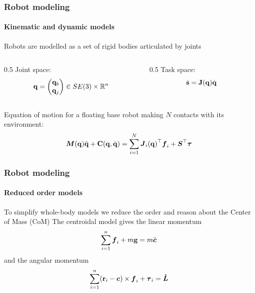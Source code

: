 \documentclass[10pt]{beamer}
\begin{document}
\begin{frame}
  \frametitle{Robot modeling}
  \framesubtitle{Kinematic and dynamic models}
  Robots are modelled as a set of rigid bodies articulated by joints
  \vfill
  \begin{columns}[T]
    \begin{column}{0.5\textwidth}
      Joint space:
      \begin{equation*}
        \mathbf{q} =
        \begin{pmatrix}
          \mathbf{q}_b \\
          \mathbf{q}_j
        \end{pmatrix}
        \in SE{(3)} \times \mathbb{R}^n
      \end{equation*}
    \end{column}
    \begin{column}{0.5\textwidth}
      Task space:
      \vfill
      \begin{equation*}
        \dot{{\bf s}} = \mathbf{J}(\mathbf{q})\dot{\mathbf{q}}
      \end{equation*}
    \end{column}
  \end{columns}
  \vfill
  Equation of motion for a floating base robot making $N$ contacts with its environment:
  \begin{equation*}
    \boldsymbol{M}(\mathbf{q})\ddot{\mathbf{q}} + \textbf{C}(\mathbf{q}, \dot{\mathbf{q}}) = \sum_{i =
    1}^{N}{\boldsymbol{J}_{i}(\mathbf{q})}^\top\boldsymbol{f}_i + {\boldsymbol{S}}^\top\boldsymbol{\tau}
  \end{equation*}
\end{frame}

\begin{frame}
  \frametitle{Robot modeling}
  \framesubtitle{Reduced order models}
  To simplify whole-body models we reduce the order and reason about the Center of Mass (CoM)
  \vfill
  The centroidal model gives the linear momentum
  \begin{equation}
    \label{Eq:NE_sum_forces}
    \sum_{i=1}^{n} \boldsymbol{f}_{i} + m\mathbf{g} = m\ddot{\boldsymbol{c}}
  \end{equation}
  and the angular momentum
  \begin{equation}
    \label{Eq:NE_sum_moments}
    \sum_{i=1}^{n} (\mathbf{r}_{i} - \boldsymbol{c}) \times \boldsymbol{f}_{i} + \boldsymbol{\tau}_{i} = \boldsymbol{\dot{L}}
  \end{equation}
\end{frame}
\end{document}
